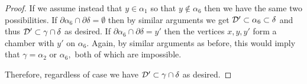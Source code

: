 \documentclass[class=book, crop=false]{standalone}
\begin{document}
\begin{proof}
	If we assume instead that $y\in\alpha_1$ so that $y\not\in \alpha_6$ then we have the same two possibilities. If $\partial \alpha_6\cap \partial \delta=\emptyset$ then by similar arguments we get $\mathcal{D}'\subset \alpha_6\subset \delta$ and thus $\mathcal{D}'\subset \gamma\cap \delta$ as desired. If $\partial \alpha_6\cap \partial\delta=y'$ then the vertices $x,y,y'$ form a chamber with $y'$ on $\alpha_6.$ Again, by similar arguments as before, this would imply that $\gamma=\alpha_2$ or $\alpha_6,$ both of which are impossible.

	Therefore, regardless of case we have $\mathcal{D}'\subset \gamma\cap \delta$ as desired.
	

\end{proof}
%
%
%
\end{document}
